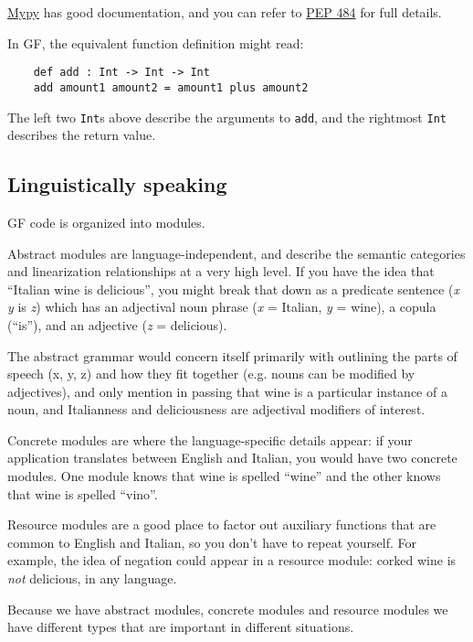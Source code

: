 \documentclass{scrartcl}
\begin{document}
\href{http://mypy-lang.org/}{Mypy} has good documentation, and you can refer to \href{https://www.python.org/dev/peps/pep-0484/}{PEP 484} for full details.

In GF, the equivalent function definition might read:

\begin{verbatim}
    def add : Int -> Int -> Int
    add amount1 amount2 = amount1 plus amount2
\end{verbatim}

The left two \texttt{Int}s above describe the arguments to \texttt{add}, and the rightmost \texttt{Int} describes the return value.

\subsection{Linguistically speaking}

GF code is organized into modules.

Abstract modules are language-independent, and describe the semantic categories and linearization relationships at a very high level. If you have the idea that ``Italian wine is delicious'', you might break that down as a predicate sentence (\emph{x} \emph{y} is \emph{z}) which has an adjectival noun phrase (\emph{x} = Italian, \emph{y} = wine), a copula (``is''), and an adjective (\emph{z} = delicious).

The abstract grammar would concern itself primarily with outlining the parts of speech (x, y, z) and how they fit together (e.g. nouns can be modified by adjectives), and only mention in passing that wine is a particular instance of a noun, and Italianness and deliciousness are adjectival modifiers of interest.

Concrete modules are where the language-specific details appear: if your application translates between English and Italian, you would have two concrete modules. One module knows that wine is spelled ``wine'' and the other knows that wine is spelled ``vino''.

Resource modules are a good place to factor out auxiliary functions that are common to English and Italian, so you don't have to repeat yourself. For example, the idea of negation could appear in a resource module: corked wine is \emph{not} delicious, in any language.

Because we have abstract modules, concrete modules and resource modules we have different types that are important in different situations.
\end{document}
